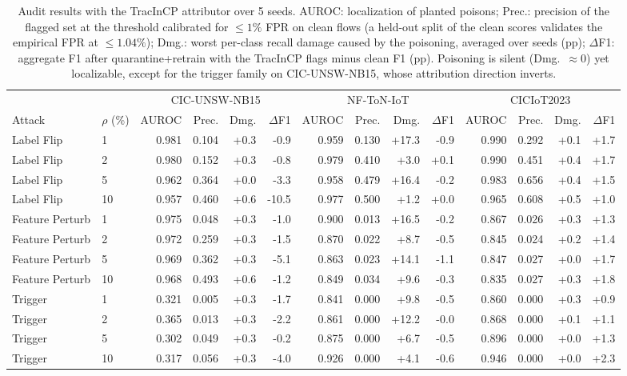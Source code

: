\begin{table}[tbp]
\centering
\footnotesize
\setlength{\tabcolsep}{4pt}
\caption{Audit results with the TracInCP attributor over 5 seeds. AUROC: localization of planted poisons; Prec.: precision of the flagged set at the threshold calibrated for $\leq 1\%$ FPR on clean flows (a held-out split of the clean scores validates the empirical FPR at $\leq 1.04\%$); Dmg.: worst per-class recall damage caused by the poisoning, averaged over seeds (pp); $\Delta$F1: aggregate F1 after quarantine+retrain with the TracInCP flags minus clean F1 (pp). Poisoning is silent (Dmg.\ $\approx 0$) yet localizable, except for the trigger family on CIC-UNSW-NB15, whose attribution direction inverts.}
\label{tab:results}
\begin{tabular}{ll rrrr rrrr rrrr}
\toprule
& & \multicolumn{4}{c}{CIC-UNSW-NB15} & \multicolumn{4}{c}{NF-ToN-IoT} & \multicolumn{4}{c}{CICIoT2023} \\
\cmidrule(lr){3-6} \cmidrule(lr){7-10} \cmidrule(lr){11-14}
Attack & $\rho$ (\%) & AUROC & Prec. & Dmg. & $\Delta$F1 & AUROC & Prec. & Dmg. & $\Delta$F1 & AUROC & Prec. & Dmg. & $\Delta$F1 \\
\midrule
Label Flip & 1 & 0.981 & 0.104 & +0.3 & -0.9 & 0.959 & 0.130 & +17.3 & -0.9 & 0.990 & 0.292 & +0.1 & +1.7 \\
Label Flip & 2 & 0.980 & 0.152 & +0.3 & -0.8 & 0.979 & 0.410 & +3.0 & +0.1 & 0.990 & 0.451 & +0.4 & +1.7 \\
Label Flip & 5 & 0.962 & 0.364 & +0.0 & -3.3 & 0.958 & 0.479 & +16.4 & -0.2 & 0.983 & 0.656 & +0.4 & +1.5 \\
Label Flip & 10 & 0.957 & 0.460 & +0.6 & -10.5 & 0.977 & 0.500 & +1.2 & +0.0 & 0.965 & 0.608 & +0.5 & +1.0 \\
Feature Perturb & 1 & 0.975 & 0.048 & +0.3 & -1.0 & 0.900 & 0.013 & +16.5 & -0.2 & 0.867 & 0.026 & +0.3 & +1.3 \\
Feature Perturb & 2 & 0.972 & 0.259 & +0.3 & -1.5 & 0.870 & 0.022 & +8.7 & -0.5 & 0.845 & 0.024 & +0.2 & +1.4 \\
Feature Perturb & 5 & 0.969 & 0.362 & +0.3 & -5.1 & 0.863 & 0.023 & +14.1 & -1.1 & 0.847 & 0.027 & +0.0 & +1.7 \\
Feature Perturb & 10 & 0.968 & 0.493 & +0.6 & -1.2 & 0.849 & 0.034 & +9.6 & -0.3 & 0.835 & 0.027 & +0.3 & +1.8 \\
Trigger & 1 & 0.321 & 0.005 & +0.3 & -1.7 & 0.841 & 0.000 & +9.8 & -0.5 & 0.860 & 0.000 & +0.3 & +0.9 \\
Trigger & 2 & 0.365 & 0.013 & +0.3 & -2.2 & 0.861 & 0.000 & +12.2 & -0.0 & 0.868 & 0.000 & +0.1 & +1.1 \\
Trigger & 5 & 0.302 & 0.049 & +0.3 & -0.2 & 0.875 & 0.000 & +6.7 & -0.5 & 0.896 & 0.000 & +0.0 & +1.3 \\
Trigger & 10 & 0.317 & 0.056 & +0.3 & -4.0 & 0.926 & 0.000 & +4.1 & -0.6 & 0.946 & 0.000 & +0.0 & +2.3 \\
\bottomrule
\end{tabular}
\end{table}
